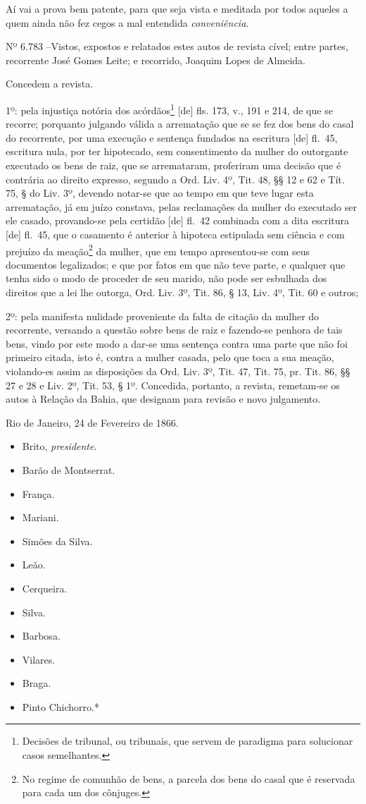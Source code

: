 Aí vai a prova bem patente, para que seja vista e meditada por todos
aqueles a quem ainda não fez cegos a mal entendida \emph{conveniência}.

Nº 6.783 --Vistos, expostos e relatados estes autos de revista cível;
entre partes, recorrente José Gomes Leite; e recorrido, Joaquim Lopes de
Almeida.

Concedem a revista.

1º: pela injustiça notória dos acórdãos\footnote{Decisões de tribunal,
  ou tribunais, que servem de paradigma para solucionar casos
  semelhantes.} {[}de{]} fls. 173, v., 191 e 214, de que se recorre;
porquanto julgando válida a arrematação que se se fez dos bens do casal
do recorrente, por uma execução e sentença fundados na escritura
{[}de{]} fl.~45, escritura nula, por ter hipotecado, sem consentimento
da mulher do outorgante executado os bens de raiz, que se arremataram,
proferiram uma decisão que é contrária ao direito expresso, segundo a
Ord. Liv. 4º, Tit. 48, §§ 12 e 62 e Tít. 75, § do Liv. 3º, devendo
notar-se que ao tempo em que teve lugar esta arrematação, já em juízo
constava, pelas reclamações da mulher do executado ser ele casado,
provando-se pela certidão {[}de{]} fl.~42 combinada com a dita escritura
{[}de{]} fl.~45, que o casamento é anterior à hipoteca estipulada sem
ciência e com prejuízo da meação\footnote{No regime de comunhão de
  bens, a parcela dos bens do casal que é reservada para cada um dos
  cônjuges.} da mulher, que em tempo apresentou-se com seus documentos
legalizados; e que por fatos em que não teve parte, e qualquer que tenha
sido o modo de proceder de seu marido, não pode ser esbulhada dos
direitos que a lei lhe outorga, Ord. Liv. 3º, Tit. 86, § 13, Liv. 4º,
Tit. 60 e outros;

2º: pela manifesta nulidade proveniente da falta de citação da mulher do
recorrente, versando a questão sobre bens de raiz e fazendo-se penhora
de tais bens, vindo por este modo a dar-se uma sentença contra uma parte
que não foi primeiro citada, isto é, contra a mulher casada, pelo que
toca a sua meação, violando-es assim as disposições da Ord. Liv. 3º,
Tit. 47, Tit. 75, pr. Tit. 86, §§ 27 e 28 e Liv. 2º, Tit. 53, § 1º.
Concedida, portanto, a revista, remetam-se os autos à Relação da Bahia,
que designam para revisão e novo julgamento.

Rio de Janeiro, 24 de Fevereiro de 1866.

\begin{itemize}
\tightlist
\item
  Brito, \emph{presidente}.
\item
  Barão de Montserrat.
\item
  França.
\item
  Mariani.
\item
  Simões da Silva.
\item
  Leão.
\item
  Cerqueira.
\item
  Silva.
\item
  Barbosa.
\item
  Vilares.
\item
  Braga.
\item
  Pinto Chichorro.*
\end{itemize}

